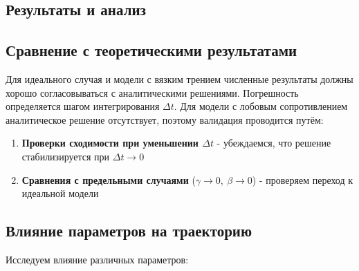 \begin{center}
    \section{Результаты и анализ}
    \subsection{Сравнение с теоретическими результатами}
\end{center}

Для идеального случая и модели с вязким трением численные результаты должны хорошо согласовываться с аналитическими решениями. Погрешность определяется шагом интегрирования $\Delta t$.
Для модели с лобовым сопротивлением аналитическое решение отсутствует, поэтому валидация проводится путём:
\begin{enumerate}
    \item \textbf{Проверки сходимости при уменьшении $\Delta t$} - убеждаемся, что решение стабилизируется при $\Delta t \to 0$
    \item \textbf{Сравнения с предельными случаями} ($\gamma \to 0, \ \beta \to 0$) - проверяем переход к идеальной модели
\end{enumerate}

\begin{center}
    \subsection{Влияние параметров на траекторию}
\end{center}

Исследуем влияние различных параметров:

